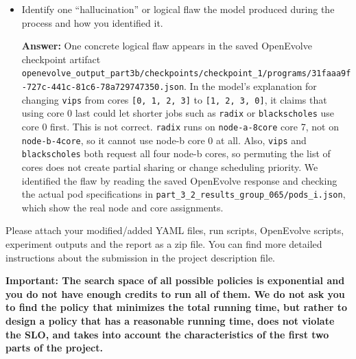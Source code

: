 \begin{enumerate}
\begin{enumerate}
\begin{itemize}
            \item Identify one ``hallucination'' or logical flaw the model produced during the process and how you identified it.

            \textbf{Answer:} One concrete logical flaw appears in the saved OpenEvolve checkpoint artifact \texttt{openevolve\_output\_part3b/checkpoints/checkpoint\_1/programs/31faaa9f-727c-441c-81c6-78a729747350.json}. In the model's explanation for changing \texttt{vips} from cores \texttt{[0, 1, 2, 3]} to \texttt{[1, 2, 3, 0]}, it claims that using core 0 last could let shorter jobs such as \texttt{radix} or \texttt{blackscholes} use core 0 first. This is not correct. \texttt{radix} runs on \texttt{node-a-8core} core 7, not on \texttt{node-b-4core}, so it cannot use node-b core 0 at all. Also, \texttt{vips} and \texttt{blackscholes} both request all four node-b cores, so permuting the list of cores does not create partial sharing or change scheduling priority. We identified the flaw by reading the saved OpenEvolve response and checking the actual pod specifications in \texttt{part\_3\_2\_results\_group\_065/pods\_i.json}, which show the real node and core assignments.
        \end{itemize}

    \end{enumerate}

    Please attach your modified/added YAML files, run scripts, OpenEvolve scripts, experiment outputs and the report as a zip file. You can find more detailed instructions about the submission in the project description file.

    \textbf{Important: The search space of all possible policies is exponential and you do not have enough credits to run all of them. We do not ask you to find the policy that minimizes
    the total running time, but rather to design a policy that has a reasonable running time, does not violate the SLO, and takes into account the characteristics of the first two parts of the project.}
\end{enumerate}

\newpage
